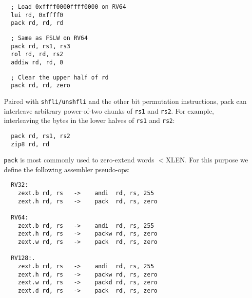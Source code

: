 \begin{minipage}{\linewidth}
\begin{verbatim}
  ; Load 0xffff0000ffff0000 on RV64
  lui rd, 0xffff0
  pack rd, rd, rd
\end{verbatim}
\end{minipage}

\begin{minipage}{\linewidth}
\begin{verbatim}
  ; Same as FSLW on RV64
  pack rd, rs1, rs3
  rol rd, rd, rs2
  addiw rd, rd, 0
\end{verbatim}
\end{minipage}

\begin{minipage}{\linewidth}
\begin{verbatim}
  ; Clear the upper half of rd
  pack rd, rd, zero
\end{verbatim}
\end{minipage}

Paired with {\tt shfli/unshfli} and the other bit permutation instructions,
pack can interleave arbitrary power-of-two chunks of {\tt rs1} and {\tt rs2}. For
example, interleaving the bytes in the lower halves of {\tt rs1} and {\tt rs2}:

\begin{minipage}{\linewidth}
\begin{verbatim}
  pack rd, rs1, rs2
  zip8 rd, rd
\end{verbatim}
\end{minipage}

{\tt pack} is most commonly used to zero-extend words $<$XLEN.
For this purpose we define the following assembler pseudo-ops:

\begin{minipage}{\linewidth}
\begin{verbatim}
  RV32:
    zext.b rd, rs   ->    andi  rd, rs, 255
    zext.h rd, rs   ->    pack  rd, rs, zero

  RV64:
    zext.b rd, rs   ->    andi  rd, rs, 255
    zext.h rd, rs   ->    packw rd, rs, zero
    zext.w rd, rs   ->    pack  rd, rs, zero

  RV128:.
    zext.b rd, rs   ->    andi  rd, rs, 255
    zext.h rd, rs   ->    packw rd, rs, zero
    zext.w rd, rs   ->    packd rd, rs, zero
    zext.d rd, rs   ->    pack  rd, rs, zero
\end{verbatim}
\end{minipage}


